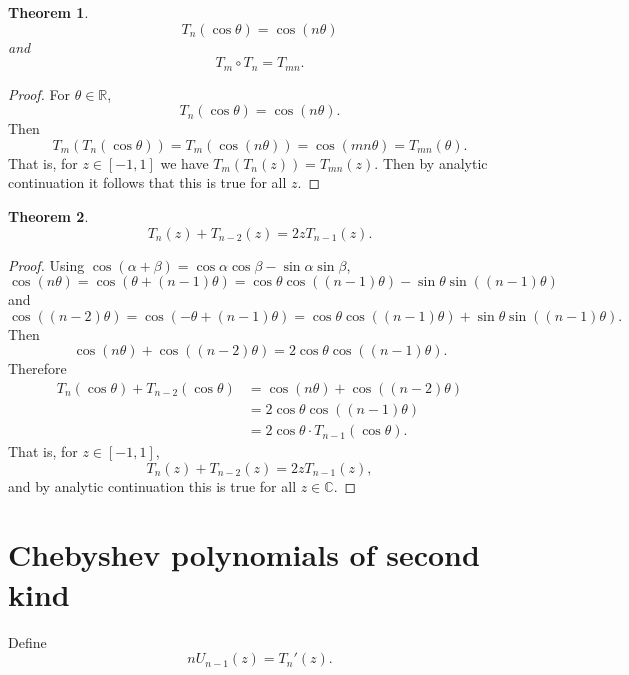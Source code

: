 \documentclass{article}
\newtheorem{theorem}{Theorem}
\theoremstyle{definition}
\begin{document}
\begin{theorem}
\[
T_n(\cos \theta) = \cos(n\theta)
\]
and
\[
T_m \circ T_n = T_{mn}.
\]
\label{Tncos}
\end{theorem}
\begin{proof}
For $\theta \in \mathbb{R}$,
\[
T_n(\cos \theta) = \cos(n\theta).
\]
Then
\[
T_m(T_n(\cos \theta)) = T_m( \cos (n\theta))
=\cos (mn\theta)
=T_{mn}(\theta).
\]
That is, for $z \in [-1,1]$ we have
$T_m(T_n(z)) = T_{mn}(z)$. Then by analytic continuation it follows that
this is true for all $z$.
\end{proof}

\begin{theorem}
\[
T_n(z)+T_{n-2}(z)=2zT_{n-1}(z).
\]
\end{theorem}
\begin{proof}
Using $\cos(\alpha+\beta)=\cos \alpha \cos \beta - \sin \alpha \sin \beta$, 
\[
\cos(n\theta) = \cos(\theta+(n-1)\theta)
=\cos \theta \cos((n-1)\theta)-\sin\theta\sin((n-1)\theta)
\]
and
\[
\cos((n-2)\theta) = \cos(-\theta+(n-1)\theta)
=\cos \theta \cos((n-1)\theta)+\sin\theta\sin((n-1)\theta).
\]
Then
\[
\cos(n\theta)+\cos((n-2)\theta)=2 \cos \theta \cos((n-1)\theta).
\]
Therefore
\begin{align*}
T_n(\cos \theta)+T_{n-2}(\cos\theta)&=\cos(n\theta)
+\cos((n-2)\theta)\\
&=2 \cos \theta \cos((n-1)\theta)\\
&=2 \cos \theta \cdot T_{n-1}(\cos\theta).
\end{align*}
That is, for $z \in [-1,1]$,
\[
T_n(z)+T_{n-2}(z)=2zT_{n-1}(z),
\]
and by analytic continuation this is true for all $z \in \mathbb{C}$.
\end{proof}



\section{Chebyshev polynomials of second kind}
Define
\begin{equation}
nU_{n-1}(z) = T_n'(z).
\label{Un}
\end{equation}
\end{document}
